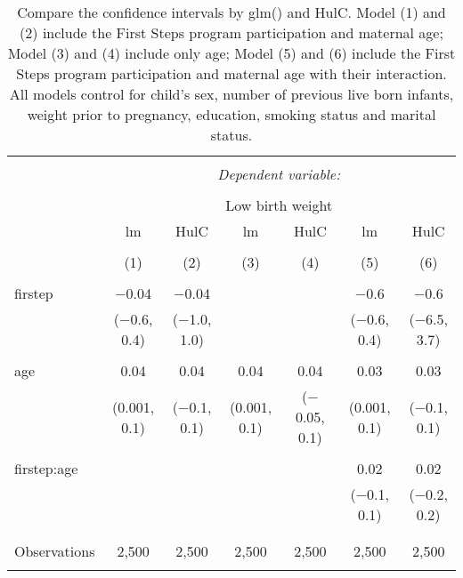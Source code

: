 
\begin{table}[!htbp] \centering 
  \caption{Compare the confidence intervals by glm() and HulC. Model (1) and (2) include the First Steps program participation and maternal age; Model (3) and (4) include only age; Model (5) and (6) include the First Steps program participation and maternal age with their interaction. All models control for child’s sex, number of previous live born infants, weight prior to pregnancy, education, smoking status and marital status.} 
  \label{tbl:glm-ci} 
\begin{tabular}{@{\extracolsep{-10pt}}lcccccc} 
\\[-1.8ex]\hline 
\hline \\[-1.8ex] 
 & \multicolumn{6}{c}{\textit{Dependent variable:}} \\ 
\cline{2-7} 
\\[-1.8ex] & \multicolumn{6}{c}{Low birth weight} \\ 
 & lm & HulC & lm & HulC & lm & HulC \\ 
\\[-1.8ex] & (1) & (2) & (3) & (4) & (5) & (6)\\ 
\hline \\[-1.8ex] 
 firstep & $-$0.04 & $-$0.04 &  &  & $-$0.6 & $-$0.6 \\ 
  & ($-$0.6, 0.4) & ($-$1.0, 1.0) &  &  & ($-$0.6, 0.4) & ($-$6.5, 3.7) \\ 
  & & & & & & \\ 
 age & 0.04 & 0.04 & 0.04 & 0.04 & 0.03 & 0.03 \\ 
  & (0.001, 0.1) & ($-$0.1, 0.1) & (0.001, 0.1) & ($-$0.05, 0.1) & (0.001, 0.1) & ($-$0.1, 0.1) \\ 
  & & & & & & \\ 
 firstep:age &  &  &  &  & 0.02 & 0.02 \\ 
  &  &  &  &  & ($-$0.1, 0.1) & ($-$0.2, 0.2) \\ 
  & & & & & & \\ 
\hline \\[-1.8ex] 
Observations & 2,500 & 2,500 & 2,500 & 2,500 & 2,500 & 2,500 \\ 
\hline 
\hline \\[-1.8ex] 
\end{tabular} 
\end{table} 
